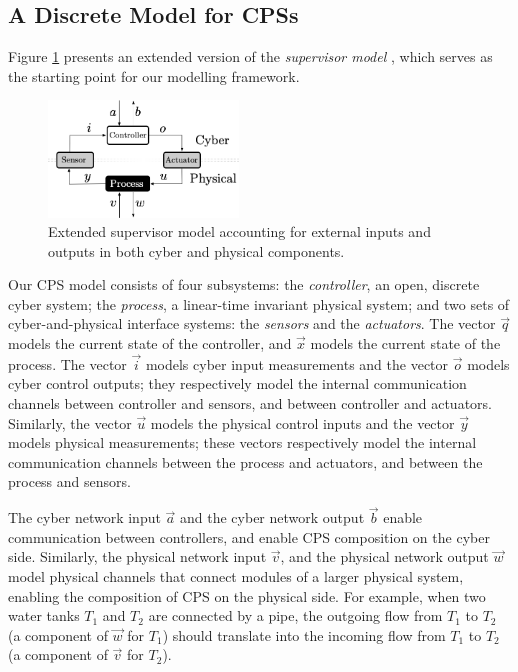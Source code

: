 \subsection{A Discrete Model for CPSs}
Figure \ref{fig:CPSRobustness:IFCPS} presents an extended version of the \emph{supervisor model} \cite{doi:10.1137/0325013}, which serves as the starting point for our modelling framework. 
\begin{figure}
\centering
\includegraphics[width=0.45\textwidth]{Figures/IFCPS}
\caption{Extended supervisor model accounting for external inputs and outputs in both cyber and physical components.}
\label{fig:CPSRobustness:IFCPS}
\end{figure}
Our CPS model consists of four subsystems: the \emph{controller}, an open, discrete cyber system; the \emph{process}, a linear-time invariant physical system; and two sets of cyber-and-physical interface systems: the \emph{sensors} and the \emph{actuators}. The vector $\vec{q}$ models the current state of the controller, and $\vec{x}$ models the current state of the process. The vector $\vec{i}$ models cyber input measurements and the vector $\vec{o}$ models cyber control outputs; they respectively model the internal communication channels between controller and sensors, and between controller and actuators. Similarly, the vector $\vec{u}$ models the physical control inputs and the vector $\vec{y}$ models physical measurements; these vectors respectively model the internal communication channels between the process and actuators, and between the process and sensors. 

The cyber network input $\vec{a}$ and the cyber network output $\vec{b}$ enable communication between controllers, and enable CPS composition on the cyber side. Similarly, the physical network input $\vec{v}$, and the physical network output $\vec{w}$ model physical channels that connect modules of a larger physical system, enabling the composition of CPS on the physical side. For example, when two water tanks $T_1$ and $T_2$ are connected by a pipe, the outgoing flow from $T_1$ to $T_2$ (a component of $\vec{w}$ for $T_1$) should translate into the incoming flow from $T_1$ to $T_2$ (a component of $\vec{v}$ for $T_2$). 

